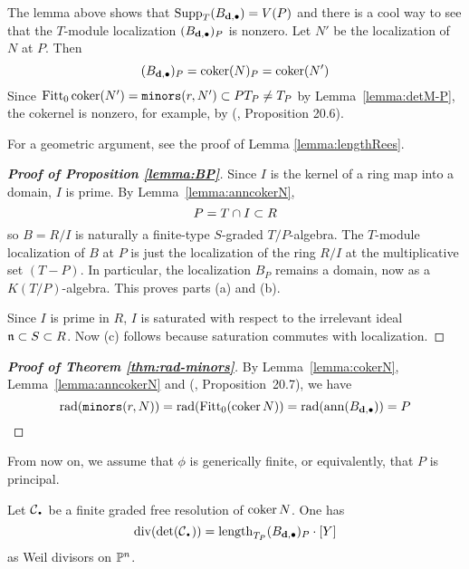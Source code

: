 \documentclass[fleqn,reqno]{amsart}
\begin{document}
\begin{remarkhint}
The lemma above shows that $\operatorname{Supp}_T (B_{\mathbf d,\bullet})=V(P)$ and there is a cool way
to see that the $T$-module localization $(B_{\mathbf d,\bullet})_P$ is nonzero.
Let $N'$ be the localization of $N$ at $P$.
Then 
\[
	(B_{\mathbf d,\bullet})_P=\operatorname{coker}(N)_P=\operatorname{coker}(N')
\]
Since $\operatorname{Fitt}_0\operatorname{coker}(N')=\mathop{\tt minors}(r,N')\subset PT_P\neq T_P$ by Lemma~\ref{lemma:detM-P},
the cokernel is nonzero, for example, by (\citet{Eis95}, Proposition 20.6).

For a geometric argument, see the proof of Lemma \ref{lemma:lengthRees}.
\end{remarkhint}

\begin{proof}[\bf Proof of Proposition \ref{lemma:BP}]
Since $I$ is the kernel of a ring map into a domain, $I$ is prime.
By Lemma~\ref{lemma:anncokerN},
\[
	P=T\cap I\subset R
\]
so $B=R/I$ is naturally a finite-type $S$-graded $T/P$-algebra.
The $T$-module localization of $B$ at $P$ is just
the localization of the ring $R/I$ at the multiplicative set $(T-P)$.
In particular, the localization $B_P$ remains a domain,
now as a $K(T/P)$-algebra.
This proves parts (a) and (b).

Since $I$ is prime in $R$, $I$ is saturated with respect to the irrelevant ideal $\mathfrak{n}\subset S\subset R$.
Now (c) follows because saturation commutes with localization.
\end{proof}

\begin{proof}[\bf Proof of Theorem \ref{thm:rad-minors}]
By Lemma~\ref{lemma:cokerN}, Lemma~\ref{lemma:anncokerN} and
(\citet{Eis95}, Proposition~20.7),
we have
\[
	\operatorname{rad}(\mathop{\tt minors}(r,N))=\operatorname{rad}(\operatorname{Fitt}_0(\operatorname{coker} N))=\operatorname{rad}(\operatorname{ann} (B_{\mathbf d,\bullet}))=P\qedhere
\]
\end{proof}

\begin{paragraf*}
From now on, we assume that $\phi$ is generically finite, or equivalently,
that $P$ is principal.
\end{paragraf*}

\begin{lemma}
\label{lemma:divdetC}
Let $\mathcal{C}_\nbul$ be a finite graded free resolution of $\operatorname{coker} N$. One has
\[
	\thediv(\det(\mathcal{C}_\nbul))=\length_{T_P}(B_{\d,\bullet})_P\cdot[Y]
\]
as Weil divisors on $\mathbb{P}^n$.
\end{lemma}
\end{document}
